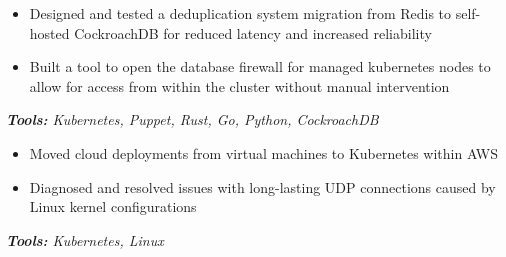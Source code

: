\documentclass[10pt,letter]{altacv}
\begin{document}

\begin{fullwidth}
\marginpar{\makesidebarheader}
    \vspace*{-1\baselineskip}
\makecvheader
\end{fullwidth}


\begin{itemize}
  \item Designed and tested a deduplication system migration from Redis to self-hosted CockroachDB for reduced latency and increased reliability
  \item Built a tool to open the database firewall for managed kubernetes nodes to allow for access from within the cluster without manual intervention
\end{itemize}
\textit{\textbf{Tools:} Kubernetes, Puppet, Rust, Go, Python, CockroachDB}


\begin{itemize}
  \item Moved cloud deployments from virtual machines to Kubernetes within AWS
  \item Diagnosed and resolved issues with long-lasting UDP connections caused by Linux kernel configurations
\end{itemize}
\textit{\textbf{Tools:} Kubernetes, Linux}
\end{document}
